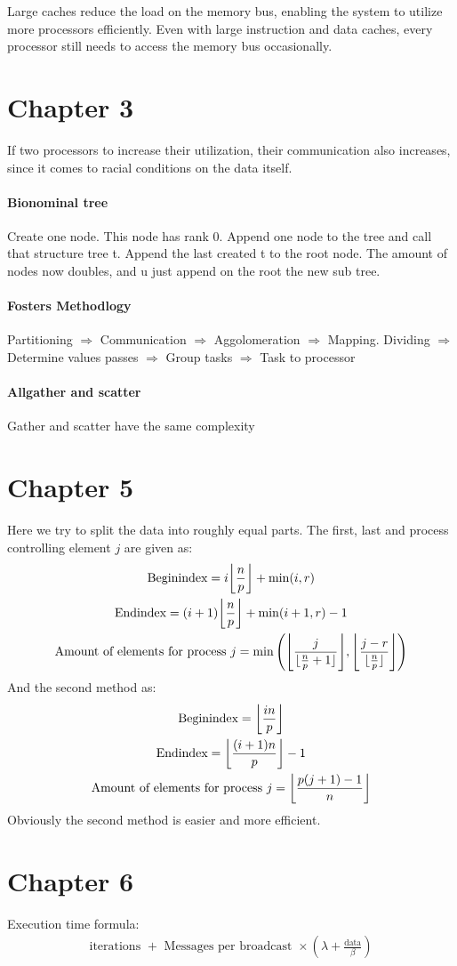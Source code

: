 Large caches reduce the load on the memory bus, enabling the system to utilize more processors efficiently. Even with large instruction and data caches, every processor still needs to access the memory bus occasionally.

\section{Chapter 3}
If two processors to increase their utilization, their communication also increases, since it comes to racial conditions on the data itself.

\paragraph{Bionominal tree}
Create one node. This node has rank 0. Append one node to the tree and call that structure tree t. Append the last created t to the root node. The amount of nodes now doubles, and u just append on the root the new sub tree.

\paragraph{Fosters Methodlogy}
Partitioning $\Rightarrow$ Communication $\Rightarrow$ Aggolomeration $\Rightarrow$ Mapping.
 Dividing   $\Rightarrow$   Determine values passes   $\Rightarrow$  Group tasks  $\Rightarrow$  Task to processor

\paragraph{Allgather and scatter}
Gather and scatter have the same complexity

\section{Chapter 5}

Here we try to split the data into roughly equal parts.
The first, last and process controlling element $j$ are given as:
\begin{gather*}
\text{Beginindex} = i \floor*{\frac{n}{p}} + \min( i,r)\\
\text{Endindex} = (i+1) \floor*{\frac{n}{p}} + \min( i+1,r)-1\\
\text{Amount of elements for process }j = \min\left( \floor*{\frac{j}{\floor{\frac{n}{p}+1}} }, \floor*{ \frac{j-r}{\floor{\frac{n}{p}}}} \right)
\end{gather*}
And the second method as:
\begin{gather*}
\text{Beginindex} = \floor*{\frac{in }{p}}\\
\text{Endindex} = \floor*{\frac{(i+1)n}{p}} -1\\
\text{Amount of elements for process }j = \floor*{\frac{p(j+1)-1}{n}}
\end{gather*}
Obviously the second method is easier and more efficient.

\section{Chapter 6}

Execution time formula:
\begin{gather*}
\text{iterations } + \text{ Messages per broadcast } \times \left( \lambda  + \frac{\text{data}}{\beta} \right)
\end{gather*}